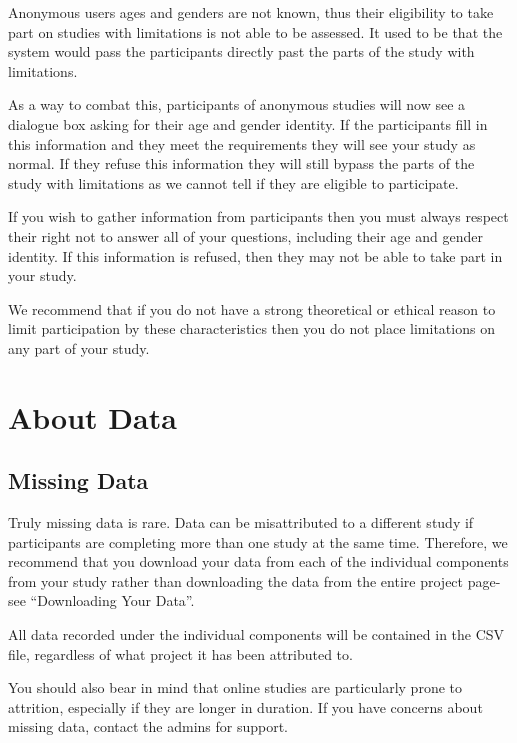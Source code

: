 \documentclass[]{book}
\begin{document}
Anonymous users ages and genders are not known, thus their eligibility
to take part on studies with limitations is not able to be assessed. It
used to be that the system would pass the participants directly past the
parts of the study with limitations.

As a way to combat this, participants of anonymous studies will now see
a dialogue box asking for their age and gender identity. If the
participants fill in this information and they meet the requirements
they will see your study as normal. If they refuse this information they
will still bypass the parts of the study with limitations as we cannot
tell if they are eligible to participate.

If you wish to gather information from participants then you must always
respect their right not to answer all of your questions, including their
age and gender identity. If this information is refused, then they may
not be able to take part in your study.

We recommend that if you do not have a strong theoretical or ethical
reason to limit participation by these characteristics then you do not
place limitations on any part of your study.

\section*{About Data}\label{about-data}

\subsection*{Missing Data}\label{missing-data}

Truly missing data is rare. Data can be misattributed to a different
study if participants are completing more than one study at the same
time. Therefore, we recommend that you download your data from each of
the individual components from your study rather than downloading the
data from the entire project page- see ``Downloading Your Data''.

All data recorded under the individual components will be contained in
the CSV file, regardless of what project it has been attributed to.

You should also bear in mind that online studies are particularly prone
to attrition, especially if they are longer in duration. If you have
concerns about missing data, contact the admins for support.
\end{document}
